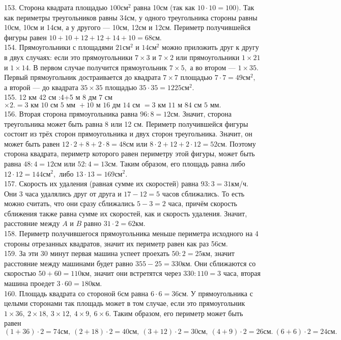 153. Сторона квадрата площадью $100\text{см}^2$ равна 10см (так как $10\cdot10=100).$ Так как периметры треугольников равны 34см, у одного треугольника стороны равны 10см, 10см и 14см, а у другого --- 10см, 12см и 12см. Периметр получившейся фигуры равен $10+10+12+12+14+10=68$см.\\
154. Прямоугольники с площадями $21\text{см}^2$ и $14\text{см}^2$ можно приложить друг к другу в двух случаях: если это прямоугольники $7\times3$ и $7\times2$ или прямоугольники $1\times21$ и $1\times14.$ В первом случае получится прямоугольник $7\times5,$ а во втором --- $1\times35.$ Первый прямоугольник достраивается до квадрата $7\times7$ площадью $7\cdot7=49\text{см}^2,$ а второй --- до квадрата $35\times35$ площадью $35\cdot35=1225\text{см}^2.$\\
155. 12 км 42 см :4+5 м 8 дм 7 см$\times2.=3\text{ км }10\text{ см }5\text{ мм }+10\text{ м }16\text{ дм }14\text{ см }=3\text{ км }11\text{ м }84\text{ см }5\text{ мм.}$\\
156. Вторая сторона прямоугольника равна $96:8=12$см. Значит, сторона треугольника может быть равна 8 или 12 см. Периметр получившейся фигуры состоит из трёх сторон прямоугольника и двух сторон треугольника. Значит, он может быть равен $12\cdot2+8+2\cdot8=48$см или $8\cdot2+12+2\cdot12=52$см. Поэтому сторона квадрата, периметр которого равен периметру этой фигуры, может быть равна $48:4=12$см или $52:4=13$см. Таким образом, его площадь равна либо $12\cdot12=144\text{см}^2,$ либо $13\cdot13=169\text{см}^2.$\\
157. Скорость их удаления (равная сумме их скоростей) равна $93:3=31$км/ч. Они 3 часа удалялись друг от друга и $17-12=5$ часов сближались. То есть можно считать, что они сразу сближались $5-3=2$ часа, причём скорость сближения также равна сумме их скоростей, как и скорость удаления. Значит, расстояние между  $A$ и $B$ равно $31\cdot2=62$км.\\
158. Периметр получившегося прямоугольника меньше периметра исходного на 4 стороны отрезанных квадратов, значит их периметр равен как раз 56см.\\
159. За эти 30 минут первая машина успеет проехать $50:2=25$км, значит расстояние между машинами будет равно $355-25=330$км. Они сближаются со скоростью $50+60=110$км, значит они встретятся через $330:110=3$ часа, вторая машина проедет $3\cdot60=180$км.\\
160. Площадь квадрата со стороной 6см равна $6\cdot6=36$см. У прямоугольника с целыми сторонами так площадь может в том случае, если это прямоугольник $1\times36,\ 2\times18,\ 3\times12,\ 4\times9,\ 6\times6.$ Таким образом, его периметр может быть равен $(1+36)\cdot2=74\text{см},\ (2+18)\cdot2=40\text{см},\ (3+12)\cdot2=30\text{см},\ (4+9)\cdot2=26\text{см}.\ (6+6)\cdot2=24\text{см}.$\\
